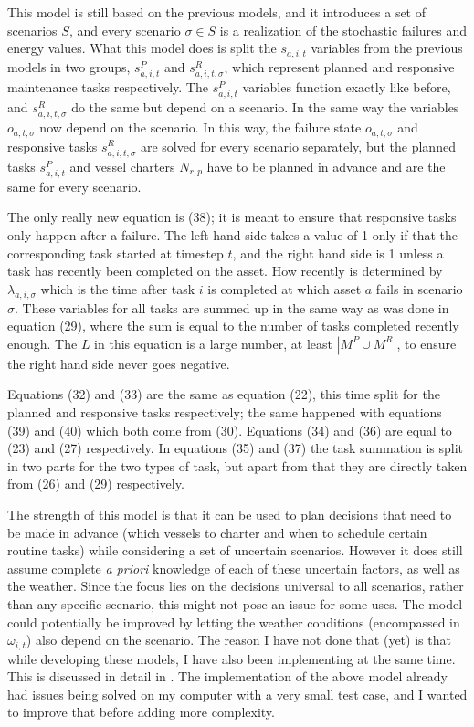 \documentclass[a4paper,12pt]{article}
\begin{document}
\bigskip

This model is still based on the previous models, and it introduces a set of scenarios $S$, and every scenario $\sigma \in S$ is a realization of the stochastic failures and energy values. What this model does is split the $s_{a,i,t}$ variables from the previous models in two groups, $s^P_{a,i,t}$ and $s^R_{a,i,t,\sigma}$, which represent planned and responsive maintenance tasks respectively. The $s^P_{a,i,t}$ variables function exactly like before, and $s^R_{a,i,t,\sigma}$ do the same but depend on a scenario. In the same way the variables $o_{a,t,\sigma}$ now depend on the scenario. In this way, the failure state $o_{a,t,\sigma}$ and responsive tasks $s^R_{a,i,t,\sigma}$ are solved for every scenario separately, but the planned tasks $s^P_{a,i,t}$ and vessel charters $N_{r,p}$ have to be planned in advance and are the same for every scenario. 

The only really new equation is (38); it is meant to ensure that responsive tasks only happen after a failure. The left hand side takes a value of 1 only if that the corresponding task started at timestep $t$, and the right hand side is 1 unless a task has recently been completed on the asset. How recently is determined by $\lambda_{a,i,\sigma}$ which is the time after task $i$ is completed at which asset $a$ fails in scenario $\sigma$. These variables for all tasks are summed up in the same way as was done in equation (29), where the sum is equal to the number of tasks completed recently enough. The $L$ in this equation is a large number, at least $|M^P \cup M^R|$, to ensure the right hand side never goes negative. 

Equations (32) and (33) are the same as equation (22), this time split for the planned and responsive tasks respectively; the same happened with equations (39) and (40) which both come from (30). Equations (34) and (36) are equal to (23) and (27) respectively. In equations (35) and (37) the task summation is split in two parts for the two types of task, but apart from that they are directly taken from (26) and (29) respectively. 

\bigskip

The strength of this model is that it can be used to plan decisions that need to be made in advance (which vessels to charter and when to schedule certain routine tasks) while considering a set of uncertain scenarios. However it does still assume complete \textit{a priori} knowledge of each of these uncertain factors, as well as the weather. Since the focus lies on the decisions universal to all scenarios, rather than any specific scenario, this might not pose an issue for some uses. The model could potentially be improved by letting the weather conditions (encompassed in $\omega_{i,t}$) also depend on the scenario. The reason I have not done that (yet) is that while developing these models, I have also been implementing at the same time. This is discussed in detail in . The implementation of the above model already had issues being solved on my computer with a very small test case, and I wanted to improve that before adding more complexity.
\end{document}
